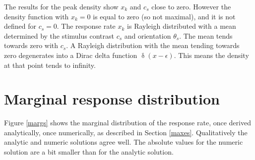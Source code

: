 \documentclass{scrartcl}
\begin{document}
The results for the peak density show $x_k$ and $c_s$ close to zero. However the density function with $x_k = 0$ is equal to zero (so not maximal), and it is not defined for $c_s = 0$. The response rate $x_k$ is Rayleigh distributed with a mean determined by the stimulus contrast $c_s$ and orientation $\theta_s$. The mean tends towards zero with $c_s$. A Rayleigh distribution with the mean tending towards zero degenerates into a Dirac delta function $\operatorname{\delta}(x - \epsilon)$. This means the density at that point tends to infinity.

\section{Marginal response distribution}

Figure \ref{margs} shows the marginal distribution of the response rate, once derived analytically, once numerically, as described in Section \ref{maxes}. Qualitatively the analytic and numeric solutions agree well. The absolute values for the numeric solution are a bit smaller than for the analytic solution.
\end{document}
